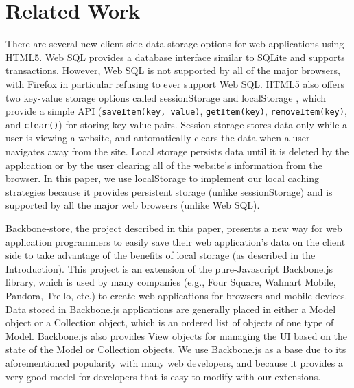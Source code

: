 \documentclass[12pt]{article}
\begin{document}
\section{Related Work}

There are several new client-side data storage options for web applications
using HTML5. Web SQL \cite{websql} provides a database interface similar to SQLite and supports
transactions. However, Web SQL is not supported by all of the major browsers,
with Firefox in particular refusing to ever support Web SQL. HTML5 also offers two key-value storage options called sessionStorage and localStorage \cite{localstorage}, which provide a simple API (\verb=saveItem(key, value)=, \verb=getItem(key)=,
\verb=removeItem(key)=, and \verb=clear()=) for storing key-value pairs. 
Session storage stores data only while a user is viewing a website, and
automatically clears the data when a user navigates away from the site. Local
storage persists data until it is deleted by the application or by the user
clearing all of the website's information from the browser. In this paper, we use localStorage to implement our local caching strategies because it provides persistent storage (unlike sessionStorage) and is supported by all the major web browsers (unlike Web SQL). 

Backbone-store, the project described in this paper, presents a new way for web
application programmers to easily save their web application's data on the
client side to take advantage of the benefits of local storage (as described in the Introduction). This project is an extension of the pure-Javascript Backbone.js \cite{backbone} library, which is used by many companies (e.g., Four Square, Walmart Mobile, Pandora, Trello, etc.) to create web applications for browsers and mobile devices. Data
stored in Backbone.js applications are generally placed in either a Model
object or a Collection object, which is an ordered list of objects of one type
of Model. Backbone.js also provides View objects for managing the UI based on
the state of the Model or Collection objects. We use Backbone.js as a base due
to its aforementioned popularity with many web developers, and because it
provides a very good model for developers that is easy to modify with our extensions.
\end{document}
